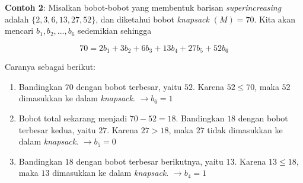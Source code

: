 \documentclass{article}
\begin{document}

\textbf{Contoh 2}: Misalkan bobot-bobot yang membentuk barisan \textit{superincreasing} adalah $\{2, 3, 6, 13, 27, 52\}$, dan diketahui bobot \textit{knapsack} $(M) = 70$. Kita akan mencari $b_1, b_2, ..., b_6$ sedemikian sehingga

\[ 70 = 2b_1 + 3b_2 + 6b_3 + 13b_4 + 27b_5 + 52b_6 \]

Caranya sebagai berikut:

\begin{enumerate}
    \item Bandingkan $70$ dengan bobot terbesar, yaitu $52$. Karena $52 \le 70$, maka $52$ dimasukkan ke dalam \textit{knapsack}. $\rightarrow b_6 = 1$
    \item Bobot total sekarang menjadi $70 - 52 = 18$. Bandingkan $18$ dengan bobot terbesar kedua, yaitu $27$. Karena $27 > 18$, maka $27$ tidak dimasukkan ke dalam \textit{knapsack}. $\rightarrow b_5 = 0$
    \item Bandingkan $18$ dengan bobot terbesar berikutnya, yaitu $13$. Karena $13 \le 18$, maka $13$ dimasukkan ke dalam \textit{knapsack}. $\rightarrow b_4 = 1$
\end{enumerate}
\end{document}
